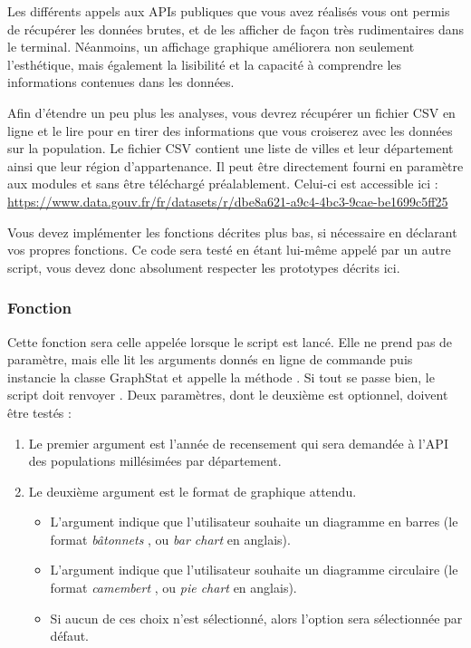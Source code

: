 \bigskip

\noindent Les différents appels aux APIs publiques que vous avez réalisés vous ont permis de récupérer les données brutes, et de les afficher de façon très rudimentaires dans le terminal.
Néanmoins, un affichage graphique améliorera non seulement l'esthétique, mais également la lisibilité et la capacité à comprendre les informations contenues dans les données.

\medskip

\noindent Afin d'étendre un peu plus les analyses, vous devrez récupérer un fichier CSV en ligne et le lire pour en tirer des informations que vous croiserez avec les données sur la population.
Le fichier CSV contient une liste de villes et leur département ainsi que leur région d'appartenance.
Il peut être directement fourni en paramètre aux modules  et  sans être téléchargé préalablement.
Celui-ci est accessible ici : \url{https://www.data.gouv.fr/fr/datasets/r/dbe8a621-a9c4-4bc3-9cae-be1699c5ff25}

\bigskip

\noindent Vous devez implémenter les fonctions décrites plus bas, si nécessaire en déclarant vos propres fonctions.
Ce code sera testé en étant lui-même appelé par un autre script, vous devez donc absolument respecter les prototypes décrits ici.


\bigskip


\subsubsection*{Fonction }

\noindent Cette fonction sera celle appelée lorsque le script est lancé.
Elle ne prend pas de paramètre, mais elle lit les arguments donnés en ligne de commande puis instancie la classe GraphStat et appelle la méthode .
Si tout se passe bien, le script doit renvoyer .
Deux paramètres, dont le deuxième est optionnel, doivent être testés :

\begin{enumerate}
\item Le premier argument est l'année de recensement qui sera demandée à l'API des populations millésimées par département.

\item Le deuxième argument est le format de graphique attendu.
  \begin{itemize}
  \item L'argument  indique que l'utilisateur souhaite un diagramme en barres (le format \og \textit{bâtonnets} \fg{}, ou \textit{bar chart} en anglais).
  \item L'argument  indique que l'utilisateur souhaite un diagramme circulaire (le format \og \textit{camembert} \fg{}, ou \textit{pie chart} en anglais).
  \item Si aucun de ces choix n'est sélectionné, alors l'option  sera sélectionnée par défaut.
  \end{itemize}
\end{enumerate}

